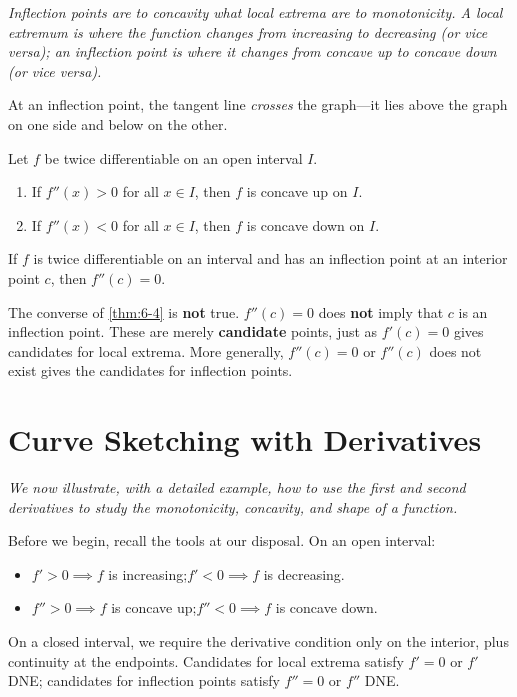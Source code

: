 \textit{Inflection points are to concavity what local extrema are to monotonicity.  A local extremum is where the function changes from increasing to decreasing (or vice versa); an inflection point is where it changes from concave up to concave down (or vice versa).}

At an inflection point, the tangent line \emph{crosses} the graph---it lies above the graph on one side and below on the other.

\begin{theorem}
\label{thm:6-3}
Let $f$ be twice differentiable on an open interval $I$.
\begin{enumerate}[label=(\roman*)]
  \item If $f''(x) > 0$ for all $x \in I$, then $f$ is concave up on $I$.
  \item If $f''(x) < 0$ for all $x \in I$, then $f$ is concave down on $I$.
\end{enumerate}
\end{theorem}

\begin{theorem}
\label{thm:6-4}
If $f$ is twice differentiable on an interval and has an inflection point at an interior point $c$, then $f''(c) = 0$.
\end{theorem}

\begin{remark}[Warning]
The converse of \cref{thm:6-4} is \textbf{not} true.  $f''(c) = 0$ does \textbf{not} imply that $c$ is an inflection point.  These are merely \textbf{candidate} points, just as $f'(c)=0$ gives candidates for local extrema.  More generally, $f''(c) = 0$ or $f''(c)$ does not exist gives the candidates for inflection points.
\end{remark}

\section{Curve Sketching with Derivatives}
\label{sec:6.14}

\textit{We now illustrate, with a detailed example, how to use the first and second derivatives to study the monotonicity, concavity, and shape of a function.}

Before we begin, recall the tools at our disposal.  On an open interval:
\begin{itemize}
  \item $f' > 0 \implies f$ is increasing;\quad $f' < 0 \implies f$ is decreasing.
  \item $f'' > 0 \implies f$ is concave up;\quad $f'' < 0 \implies f$ is concave down.
\end{itemize}
On a closed interval, we require the derivative condition only on the interior, plus continuity at the endpoints.  Candidates for local extrema satisfy $f' = 0$ or $f'$ DNE; candidates for inflection points satisfy $f'' = 0$ or $f''$ DNE.

